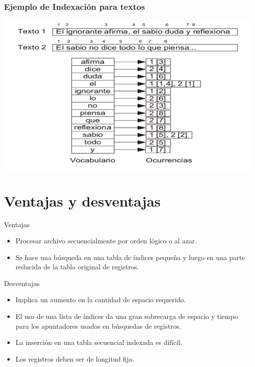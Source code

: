 \documentclass[hyperref={pdfpagelabels=false}]{beamer}
\begin{document}
\begin{frame}
\frametitle{Ejemplo de Indexaci\'on para textos}
\includegraphics[width=1.0\textwidth]{busqText.png}
\end{frame}

\section{Ventajas y desventajas}
\begin{frame}

Ventajas

\begin{itemize}
\item Procesar archivo secuencialmente por orden l\'ogico o al azar.
\item Se hace una b\'usqueda en una tabla de \'indices peque\~na y luego en una parte reducida de la tabla original de registros.
\end{itemize}

Desventajas

\begin{itemize}
\item Implica un aumento en la cantidad de espacio requerido.
\item El uso de una lista de \'indices da una gran sobrecarga de espacio y tiempo para los apuntadores usados en b\'usquedas de registros.
\item La inserci\'on en una tabla secuencial indexada es dif\'icil.
\item Los registros deben ser de longitud fija.
\end{itemize}
\end{frame}
\end{document}
